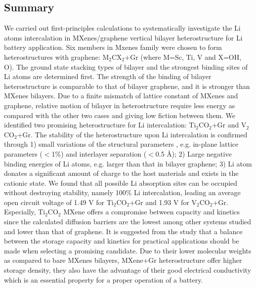 \subsection{Summary}
We carried out first-principles calculations to systematically investigate the Li atoms intercalation in MXenes/graphene vertical bilayer heterostructure for Li battery application. Six members in Mxenes family were chosen to form heterostructures with graphene: M$_2$CX$_2$+Gr (where M=Sc, Ti, V and X=OH, O). The ground state stacking types of bilayer and the strongest binding sites of Li atoms are determined first. The strength of the binding of bilayer heterostructure is comparable to that of bilayer graphene, and it is stronger than MXenes bilayers. Due to a finite mismatch of lattice constant of MXenes and graphene, relative motion of bilayer in heterostructure require less energy as compared with the other two cases and giving low fiction between them. We identified two promising heterostructure for Li intercalation: Ti$_2$CO$_2$+Gr and V$_2$CO$_2$+Gr. The stability of the heterostructure upon Li intercalation is confirmed through 1) small variations of the structural parameters , e.g. in-plane lattice parameters ($<$1\%) and interlayer separation ($<$0.5 {\AA}); 2) Large negative binding energies of Li atoms, e.g. larger than that in bilayer graphene; 3) Li atom donates a significant amount of charge to the host materials and exists in the cationic state. We found that all possible Li absorption sites can be occupied without destroying stability, namely 100\% Li intercalation, leading an average open circuit voltage of 1.49 V for Ti$_2$CO$_2$+Gr and 1.93 V for V$_2$CO$_2$+Gr. Especially, Ti$_2$CO$_2$ MXene offers a compromise between capacity and kinetics since the calculated diffusion barriers are the lowest among other systems studied and lower than that of graphene.  It is suggested from the study that a balance between the storage capacity and kinetics for practical applications should be made when selecting a promising candidate. Due to their lower molecular weights as compared to bare MXenes bilayers,  MXene+Gr heterostructure offer higher storage density, they also have the advantage of their good electrical conductivity which is an essential property for a proper operation of a battery. 